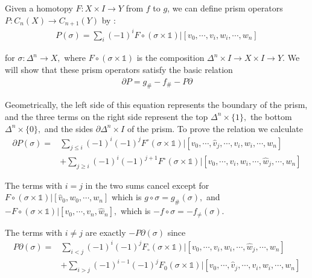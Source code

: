 \documentclass[]{ctexart}
\begin{document}
		Given a homotopy $F: X \times I \rightarrow Y$ from $f$ to $g$, we can define prism operators $P: C_{n}(X) \rightarrow C_{n+1}(Y) $ by :
			\begin{equation*}
			\begin{aligned}
			P(\sigma)=\sum_{i}(-1)^{i} F \circ(\sigma \times \mathbb{1}) |\left[v_{0}, \cdots, v_{i}, w_{i}, \cdots, w_{n}\right]
			\end{aligned}
			\end{equation*}
			
		for $\sigma: \Delta^{n} \rightarrow X,$ where $F \circ(\sigma \times \mathds{1})$ is the composition $\Delta^{n} \times I \rightarrow X \times I \rightarrow Y .$ We will show
		that these prism operators satisfy the basic relation
			\begin{equation*}
			\begin{aligned}
				\partial P=g_{\#}-f_{\#}-P \partial
			\end{aligned}
			\end{equation*}
			
		Geometrically, the left side of this equation represents the boundary of the prism, and the three terms on the right side represent the top $\Delta^{n} \times\{1\},$ the bottom $\Delta^{n} \times\{0\},$ and the sides $\partial \Delta^{n} \times I$ of the prism. To prove the relation we calculate
			\begin{equation*}
			\begin{aligned}
				\partial P(\sigma)=&\sum_{j \leq i}(-1)^{i}(-1)^{j} F^{\circ}(\sigma \times \mathds{1}) |\left[v_{0}, \cdots, \hat{v}_{j}, \cdots, v_{i}, w_{i}, \cdots, w_{n}\right] \\
				&+\sum_{j \geq i}(-1)^{i}(-1)^{j+1} F^{\circ}(\sigma \times \mathds{1}) |\left[v_{0}, \cdots, v_{i}, w_{i}, \cdots, \widehat{w}_{j}, \cdots, w_{n}\right]
			\end{aligned}
			\end{equation*}
		
		The terms with $i=j$ in the two sums cancel except for $F \circ(\sigma \times \mathds{1}) |\left[\hat{v}_{0}, w_{0}, \cdots, w_{n}\right]$ which is $g \circ \sigma=g_{\#}(\sigma),$ and $-F \circ(\sigma \times \mathds{1}) |\left[v_{0}, \cdots, v_{n}, \widehat{w}_{n}\right],$ which is $-f \circ \sigma=-f_{\neq}(\sigma)$.
		
		The terms with $i \neq j$ are exactly $-P \partial(\sigma)$ since
			\begin{equation*}
			\begin{aligned}
				P \partial(\sigma)=&\sum_{i<j}(-1)^{i}(-1)^{j} F_{\circ}(\sigma \times \mathds{1}) |\left[v_{0}, \cdots, v_{i}, w_{i}, \cdots, \widehat{w}_{j}, \cdots, w_{n}\right] \\
				&+\sum_{i>j}(-1)^{i-1}(-1)^{j} F_{0}(\sigma \times \mathds{1}) |\left[v_{0}, \cdots, \hat{v}_{j}, \cdots, v_{i}, w_{i}, \cdots, w_{n}\right]
			\end{aligned}
			\end{equation*}
			
\end{document}
